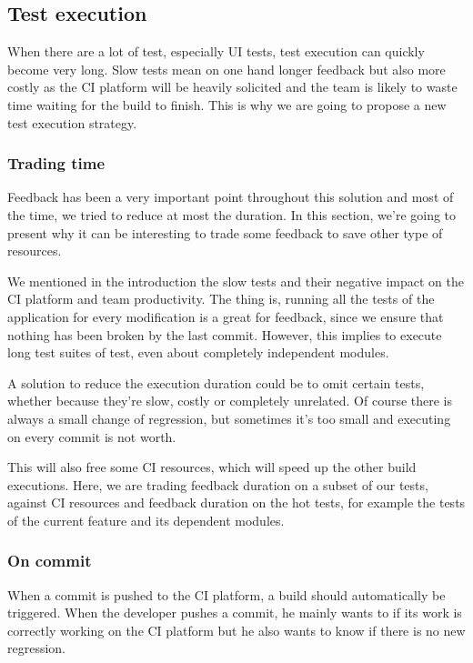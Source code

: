 \subsection{Test execution}\label{subsec:test-execution}
When there are a lot of test, especially UI tests, test execution can quickly
become very long.
Slow tests mean on one hand longer feedback but also more costly as the CI
platform will be heavily solicited and the team is likely to waste time waiting
for the build to finish.
This is why we are going to propose a new test execution strategy.

\subsubsection{Trading time}
Feedback has been a very important point throughout this solution
and most of the time, we tried to reduce at most the duration.
In this section, we're going to present why it can be interesting to
trade some feedback to save other type of resources.

We mentioned in the introduction the slow tests and their negative impact on
the CI platform and team productivity.
The thing is, running all the tests of the application for every modification
is a great for feedback, since we ensure that nothing has been broken by the
last commit.
However, this implies to execute long test suites of test, even about
completely independent modules.

A solution to reduce the execution duration could be to omit certain tests,
whether because they're slow, costly or completely unrelated.
Of course there is always a small change of regression, but sometimes it's
too small and executing on every commit is not worth.

This will also free some CI resources, which will speed up the other build
executions.
Here, we are trading feedback duration on a subset of our tests, against CI
resources and feedback duration on the hot tests, for example the tests of the
current feature and its dependent modules.

\subsubsection{On commit}
When a commit is pushed to the CI platform, a build should automatically be
triggered.
When the developer pushes a commit, he mainly wants to if its work is
correctly working on the CI platform but he also wants to know if there is no
new regression.


